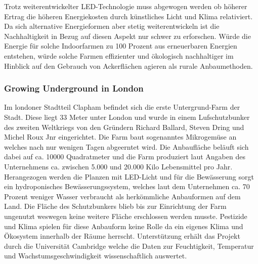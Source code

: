 \documentclass{scrartcl}
\begin{document}
Trotz weiterentwickelter LED-Technologie muss abgewogen werden ob höherer Ertrag die höheren Energiekosten durch künstliches Licht und Klima relativiert. Da sich alternative Energieformen aber stetig weiterentwickeln ist die Nachhaltigkeit in Bezug auf diesen Aspekt nur schwer zu erforschen. Würde die Energie für solche Indoorfarmen zu 100 Prozent aus erneuerbaren Energien entstehen, würde solche Farmen effizienter und ökologisch nachhaltiger im Hinblick auf den Gebrauch von Ackerflächen agieren als rurale Anbaumethoden.


\subsubsection{Growing Underground in London}

Im londoner Stadtteil Clapham befindet sich die erste Untergrund-Farm der Stadt. Diese liegt 33 Meter unter London und wurde in einem Lufschutzbunker des zweiten Weltkriegs von den Gründern  Richard Ballard, Steven Dring und Michel Roux Jnr eingerichtet. Die Farm baut sogenanntes Mikrogemüse an welches nach nur wenigen Tagen abgeerntet wird. Die Anbaufläche beläuft sich dabei auf ca. 10000 Quadratmeter und die Farm produziert laut Angaben des Unternehmens ca. zwischen 5.000 und 20.000 Kilo Lebensmittel pro Jahr. Herangezogen werden die Planzen mit LED-Licht und für die Bewässerung sorgt ein hydroponisches Bewässerungssystem, welches laut dem Unternehmen ca. 70 Prozent weniger Wasser verbraucht als herkömmliche Anbauformen auf dem Land. Die Fläche des Schutzbunkers blieb bis zur Einrichtung der Farm ungenutzt weswegen keine weitere Fläche erschlossen werden musste. Pestizide und Klima spielen für diese Anbauform keine Rolle da ein eigenes Klima und Ökosystem innerhalb der Räume herrscht. Unterstützung erhält das Projekt durch die Universität Cambridge welche die Daten zur Feuchtigkeit, Temperatur und Wachstumsgeschwindigkeit wissenschaftlich auswertet.
\end{document}
